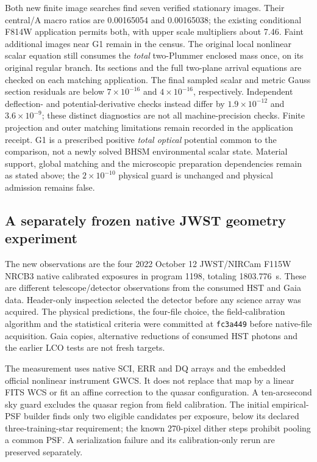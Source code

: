 Both new finite image searches find seven verified stationary images.
Their central/A macro ratios are 0.00165054 and 0.00165038; the
existing conditional F814W application permits both, with upper scale
multipliers about 7.46. Faint additional images near G1 remain in the
census. The original local nonlinear scalar equation still consumes
the \emph{total} two-Plummer enclosed mass once, on its original
regular branch. Its sections and the full two-plane arrival equations
are checked on each matching application. The final sampled scalar
and metric Gauss section residuals are below
$7\times10^{-16}$ and $4\times10^{-16}$, respectively. Independent
deflection- and potential-derivative checks instead differ by
$1.9\times10^{-12}$ and $3.6\times10^{-9}$; these distinct diagnostics
are not all machine-precision checks. Finite projection and outer
matching limitations remain recorded in the application receipt.
G1 is a prescribed positive
\emph{total optical} potential common to the comparison, not a newly
solved BHSM environmental scalar state. Material support, global
matching and the microscopic preparation dependencies remain as stated
above; the $2\times10^{-10}$ physical guard is unchanged and physical
admission remains false.

\subsection{A separately frozen native JWST geometry experiment}
\label{sec:he0435-jwst-geometry}

The new observations are the four 2022 October 12 JWST/NIRCam F115W
NRCB3 native calibrated exposures in program 1198, totaling
1803.776~s. These are different telescope/detector observations from
the consumed HST and Gaia data. Header-only inspection selected the
detector before any science array was acquired. The physical
predictions, the four-file choice, the field-calibration algorithm and
the statistical criteria were committed at
\texttt{fc3a449} before native-file acquisition. Gaia copies, alternative
reductions of consumed HST photons and the earlier LCO tests are not
fresh targets.

The measurement uses native SCI, ERR and DQ arrays and the embedded
official nonlinear instrument GWCS. It does not replace that map by a
linear FITS WCS or fit an affine correction to the quasar configuration.
A ten-arcsecond sky guard excludes the quasar region from field calibration.
The initial empirical-PSF builder finds only two eligible candidates per
exposure, below its declared three-training-star requirement; the known
270-pixel dither steps prohibit pooling a common PSF. A serialization
failure and its calibration-only rerun are preserved separately.

